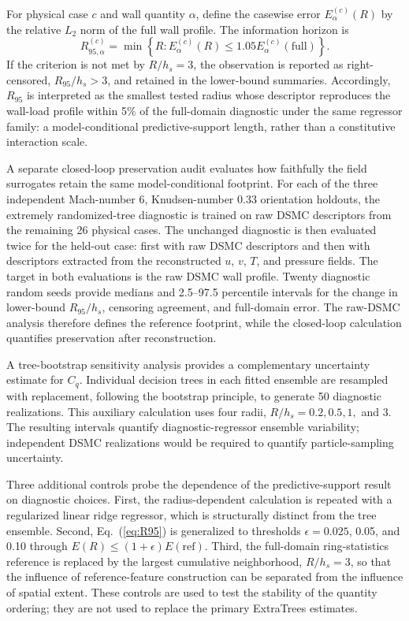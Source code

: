 \documentclass[aip,pof,preprint,notitlepage,floatfix,amsmath,amssymb]{revtex4-2}
\begin{document}
For physical case $c$ and wall quantity $\alpha$, define the casewise error $E_{\alpha}^{(c)}(R)$ by the relative $L_2$ norm of the full wall profile. The information horizon is
\begin{equation}
 R_{95,\alpha}^{(c)}=\min\left\{R:E_{\alpha}^{(c)}(R)\le1.05E_{\alpha}^{(c)}(\mathrm{full})\right\}.
 \label{eq:R95}
\end{equation}
If the criterion is not met by $R/h_s=3$, the observation is reported as right-censored, $R_{95}/h_s>3$, and retained in the lower-bound summaries. Accordingly, $R_{95}$ is interpreted as the smallest tested radius whose descriptor reproduces the wall-load profile within 5\% of the full-domain diagnostic under the same regressor family: a model-conditional predictive-support length, rather than a constitutive interaction scale.

A separate closed-loop preservation audit evaluates how faithfully the field surrogates retain the same model-conditional footprint. For each of the three independent Mach-number 6, Knudsen-number 0.33 orientation holdouts, the extremely randomized-tree diagnostic is trained on raw DSMC descriptors from the remaining 26 physical cases. The unchanged diagnostic is then evaluated twice for the held-out case: first with raw DSMC descriptors and then with descriptors extracted from the reconstructed $u$, $v$, $T$, and pressure fields. The target in both evaluations is the raw DSMC wall profile. Twenty diagnostic random seeds provide medians and 2.5--97.5 percentile intervals for the change in lower-bound $R_{95}/h_s$, censoring agreement, and full-domain error. The raw-DSMC analysis therefore defines the reference footprint, while the closed-loop calculation quantifies preservation after reconstruction.

A tree-bootstrap sensitivity analysis provides a complementary uncertainty estimate for $C_q$. Individual decision trees in each fitted ensemble are resampled with replacement, following the bootstrap principle, to generate 50 diagnostic realizations.\cite{Efron1979} This auxiliary calculation uses four radii, $R/h_s=0.2,0.5,1,$ and 3. The resulting intervals quantify diagnostic-regressor ensemble variability; independent DSMC realizations would be required to quantify particle-sampling uncertainty.

Three additional controls probe the dependence of the predictive-support result on diagnostic choices. First, the radius-dependent calculation is repeated with a regularized linear ridge regressor, which is structurally distinct from the tree ensemble. Second, Eq.~(\ref{eq:R95}) is generalized to thresholds $\epsilon=0.025$, 0.05, and 0.10 through $E(R)\le(1+\epsilon)E(\mathrm{ref})$. Third, the full-domain ring-statistics reference is replaced by the largest cumulative neighborhood, $R/h_s=3$, so that the influence of reference-feature construction can be separated from the influence of spatial extent. These controls are used to test the stability of the quantity ordering; they are not used to replace the primary ExtraTrees estimates.
\end{document}
